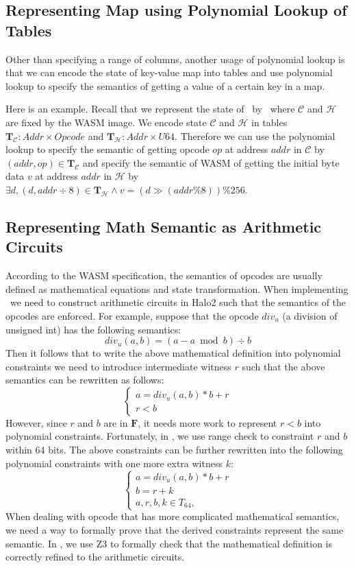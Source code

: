 \subsection{Representing Map using Polynomial Lookup of Tables}
\label{chp:map-repr}
Other than specifying a range of columns, another usage of polynomial lookup is that we can encode the state of key-value map into tables and use polynomial lookup to specify the semantics of getting a value of a certain key in a map. 

Here is an example. Recall that we represent the state of \zkwasm\, by \fullstate \, where $\mathcal{C}$ and $\mathcal{H}$ are fixed by the WASM image. We encode state $\mathcal{C}$ and $\mathcal{H}$ in tables $\mathbf{T}_\mathcal{C} : Addr \times Opcode$ and $\mathbf{T}_\mathcal{H}: Addr \times U64$. Therefore we can use the polynomial lookup to specify the semantic of getting opcode $op$ at address $addr$ in $\mathcal{C}$ by $(addr, op) \in \mathbf{T}_\mathcal{C}$ and specify the semantic of WASM of getting the initial byte data $v$ at address $addr$ in $\mathcal{H}$ by $\exists d, (d, addr \div 8) \in \mathbf{T}_\mathcal{H} \wedge v = (d \gg (addr \% 8)) \% 256$.

\subsection{Representing Math Semantic as Arithmetic Circuits}
According to the WASM specification, the semantics of opcodes are usually defined as mathematical equations and state transformation. When implementing \zkwasm \, we need to construct arithmetic circuits in Halo2 such that the semantics of the opcodes are enforced. For example, suppose that the opcode $div_u$ (a division of unsigned int) has the following semantics:
\[ div_u(a, b) = (a - a \bmod b) \div b \] 
Then it follows that to write the above mathematical definition into polynomial constraints we need to introduce intermediate witness $r$ such that the above semantics can be rewritten as follows:
\begin{equation}
\begin{cases}
    a = div_u(a,b) * b + r \\
    r < b
\end{cases}
\end{equation}
However, since $r$ and $b$ are in $\mathbf{F}$, it needs more work to represent $r < b$ into polynomial constraints. Fortunately, in \zkwasm, we use range check to constraint $r$ and $b$ within 64 bits. The above constraints can be further rewritten into the following polynomial constraints with one more extra witness $k$: 
\begin{equation}
\begin{cases}
    a = div_u(a,b) * b + r \\
    b = r + k \\
    a, r, b, k\in T_{64}, 
\end{cases}
\end{equation}
When dealing with opcode that has more complicated mathematical semantics, we need a way to formally prove that the derived constraints represent the same semantic. In \zkwasm, we use Z3 to formally check that the mathematical definition is correctly refined to the arithmetic circuits.

